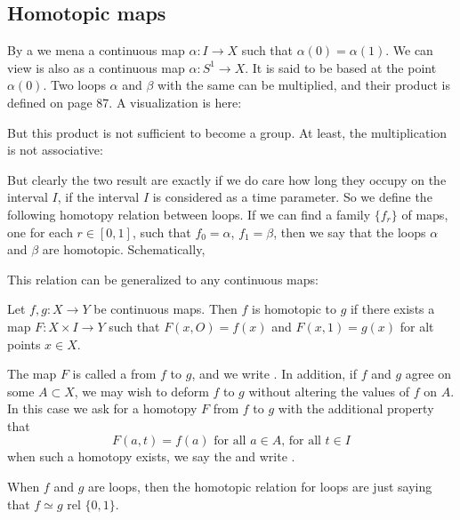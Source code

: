 
\subsection{Homotopic maps}
\label{sec:Homotopic-maps}

By a  we mena a continuous map $\alpha:I\to X$ such that
$\alpha(0)=\alpha(1)$. We can view is also as a continuous map
$\alpha:S^1 \to X$. It is said to be based at the point
$\alpha(0)$. Two loops $\alpha$ and $\beta$ with the same  can be multiplied, and their product is defined on page 87.
A visualization is here:

But this product is not sufficient to become a group. At least, the
multiplication is not associative:

But clearly the two result are exactly if we do care how long they
occupy on the interval $I$, if the interval $I$ is considered as a
time parameter. So we define the following homotopy relation between
loops. If we can find a family $\{f_r\}$ of maps, one for each $r\in
[0,1]$, such that $f_0=\alpha$, $f_1=\beta$, then we say that the
loops $\alpha$ and $\beta$ are homotopic. Schematically,

This relation can be generalized to any continuous maps:
\begin{defi}[Homotopic]
    Let $f,g: X \to Y$ be continuous maps. Then $f$ is homotopic to
    $g$ if there exists a map $F:X \times I\to Y$ such that $F(x,O) =
    f(x)$ and $F(x,1) = g(x)$ for alt points $x\in X$.
\end{defi}

The map $F$ is called a  from $f$ to $g$, and we write
. In addition, if $f$ and $g$ agree on some
$A\subset X$, we may wish to deform $f$ to $g$ without altering the
values of $f$ on $A$. In this case we ask for a homotopy $F$ from $f$
to $g$ with the additional property that 
\begin{equation}
    F(a,t)=f(a) \text{ for all $a\in A$, for all $t\in I$}
\end{equation}
when such a homotopy exists, we say the  and write .


When $f$ and $g$ are loops, then the homotopic relation for loops are
just saying that $f\simeq g$ rel $\{0,1\}$.


